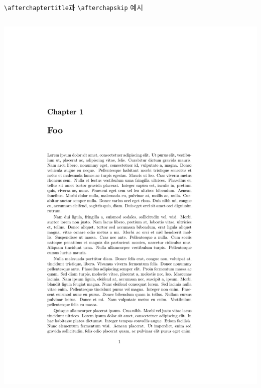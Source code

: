 \documentclass{beamer}
\def\tbs{\textbackslash}
\begin{document}
\begin{frame}[fragile]
  {\texttt{\tbs afterchaptertitle}과 \texttt{\tbs afterchapskip} 예시}
  \begin{overprint}
    \begin{columns}
      \begin{column}{0.5\textwidth}
        \begin{latexcode}
          \setlength\afterchapskip{40pt}
        \end{latexcode}
        \begin{center}
          \includegraphics[frame,page=1,width=0.8\linewidth]{examples/afterchaptertitle}
        \end{center}
      \end{column}


\end{columns}
\end{overprint}
\end{frame}
\end{document}
